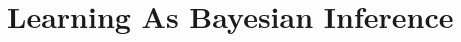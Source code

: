 \documentclass[main]{subfiles}
\begin{document}
\newpage
\section{Learning As Bayesian Inference}
\end{document}
